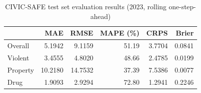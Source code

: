 \begin{table}[htbp]
  \centering
  \caption{CIVIC-SAFE test set evaluation results (2023, rolling one-step-ahead)}
  \label{tab:test_results}
  \begin{tabular}{l r r r r r}
    \toprule
    & \textbf{MAE} & \textbf{RMSE} & \textbf{MAPE (\%)} & \textbf{CRPS} & \textbf{Brier} \\
    \midrule
    Overall & 5.1942 & 9.1159 & 51.19 & 3.7704 & 0.0841 \\
    \midrule
    Violent & 3.4555 & 4.8020 & 48.66 & 2.4785 & 0.0199 \\
    Property & 10.2180 & 14.7532 & 37.39 & 7.5386 & 0.0077 \\
    Drug & 1.9093 & 2.9294 & 72.80 & 1.2941 & 0.2246 \\
    \bottomrule
  \end{tabular}
\end{table}